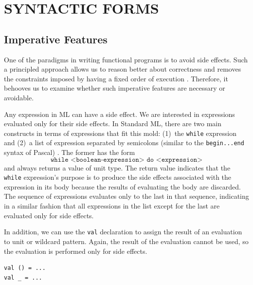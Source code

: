 \documentclass[12pt,abstracton]{scrartcl}
\begin{document}
\section{SYNTACTIC FORMS}\label{sec:syntax}
\subsection{Imperative Features}\label{subsec:imper}
One of the paradigms in writing functional programs is to avoid side effects.
Such a principled approach allows us to reason better about correctness and
removes the constraints imposed by having a fixed order of execution \cite{Hug90}. Therefore,
it behooves us to examine whether such imperative features are necessary or avoidable.

Any expression in ML can have a side effect.
We are interested in expressions evaluated only for their side effects.
In Standard ML, there are two main constructs in terms of expressions that fit this mold:
(1)~the \texttt{while} expression and (2)~a list of expression separated by semicolons (similar to the \texttt{begin...end} syntax of Pascal) \cite{Ull98}.
The former has the form
\[\texttt{while <boolean-expression> do <expression>}\] and always returns a value of unit type.
The return value indicates that the \texttt{while} expression's purpose is to produce the side effects associated
with the expression in its body because the results of evaluating the body are discarded.
The sequence of expressions evaluates only to the last in that sequence, indicating
in a similar fashion that all expressions in the list except for the last are evaluated only for side effects.

In addition, we can use the \texttt{val} declaration to assign the result
of an evaluation to unit or wildcard pattern. Again, the result of the evaluation
cannot be used, so the evaluation is performed only for side effects.
\begin{center}
\texttt{val () = ...}\\
\texttt{val \_ = ...}
\end{center}
\end{document}
